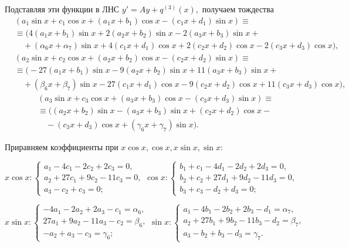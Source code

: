 \documentclass[11pt]{article}
\begin{document}
{Подставляя эти функции в ЛНС $y'=Ay+q^{(3)}(x),$ получаем тождества
\begin{align*}
&(a_1 \sin x + c_1 \cos x + (a_1 x + b_1)\cos x - (c_1 x + d_1)\sin x)\equiv \\
&\equiv \big(4(a_1 x + b_1)\sin x + 2(a_2 x + b_2)\sin x - 2(a_3 x + b_3)\sin x+ \\
&\quad + (\alpha_6 x + \alpha_7)\sin x + 4(c_1 x + d_1)\cos x + 2(c_2 x + d_2)\cos x - 2(c_3 x + d_3)\cos x\big),
\end{align*}
\vspace{-2em}
\begin{align*}
&(a_2 \sin x + c_2 \cos x + (a_2 x + b_2)\cos x - (c_2 x + d_2)\sin x)\equiv \\
&\equiv \big(-27(a_1 x + b_1)\sin x - 9(a_2 x + b_2)\sin x + 11(a_3 x + b_3)\sin x+ \\
&\quad + (\beta_6 x + \beta_7)\sin x - 27(c_1 x + d_1)\cos x - 9(c_2 x + d_2)\cos x+ 11(c_3 x + d_3)\cos x\big),
\end{align*}
\vspace{-2em}
\begin{align*}
&(a_3 \sin x + c_3 \cos x + (a_3 x + b_3)\cos x - (c_3 x + d_3)\sin x)\equiv \\
&\equiv \big((a_2 x + b_2)\sin x - (a_3 x + b_3)\sin x + (c_2 x + d_2)\cos x- \\
&\quad - (c_3 x + d_3)\cos x + (\gamma_6 x + \gamma_7)\sin x\big).
\end{align*}

\smallskip
Приравняем коэффициенты при $x \cos x, \cos x, x \sin x, \sin x$:

$x \cos x: \begin{cases} 
a_1 - 4c_1 - 2c_2 + 2c_3 = 0, \\ 
a_2 + 27c_1 + 9c_2 - 11c_3 = 0, \\ 
a_3 - c_2 + c_3 = 0; 
\end{cases}
\cos x: \begin{cases} 
b_1 + c_1 - 4d_1 - 2d_2 + 2d_3 = 0, \\ 
b_2 + c_2 + 27d_1 + 9d_2 - 11d_3 = 0, \\ 
b_3 + c_3 - d_2 + d_3 = 0; 
\end{cases}$

\hspace{-1em}
$x \sin x: \begin{cases} 
-4a_1 - 2a_2 + 2a_3 - c_1 = \alpha_6, \\ 
27a_1 + 9a_2 - 11a_3 - c_2 = \beta_6, \\ 
-a_2 + a_3 - c_3 = \gamma_6; 
\end{cases}
\sin x: \begin{cases} 
a_1 - 4b_1 - 2b_2 + 2b_3 - d_1 = \alpha_7, \\ 
a_2 + 27b_1 + 9b_2 - 11b_3 - d_2 = \beta_7, \\ 
a_3 - b_2 + b_3 - d_3 = \gamma_7.
\end{cases}$

}
\end{document}
